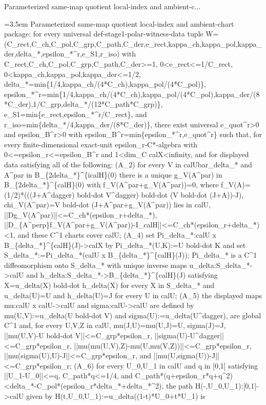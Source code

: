 \documentclass{article}
\newcommand{\step}[1]{\par\noindent\hangindent=3.5em\hangafter=1%
  \makebox[3.5em][l]{\textbf{#1.}}}
\begin{document}
\begin{proofbox}{Parameterized same-map quotient local-index and ambient-c...}
\step{1} Parameterized same-map quotient local-index and ambient-chart package: for every universal def-stage1-polar-witness-data tuple W=(C\_rect,C\_ch,C\_pol,C\_grp,C\_path,C\_der,e\_rect,kappa\_ch,kappa\_pol,kappa\_der,delta\_*,epsilon\_*\textasciicircum{}r,e\_S1,r\_iso) with C\_rect,C\_ch,C\_pol,C\_grp,C\_path,C\_der>=1, 0<e\_rect<=1/C\_rect, 0<kappa\_ch,kappa\_pol,kappa\_der<=1/2, delta\_*=min\{1/4,kappa\_ch/(4*C\_ch),kappa\_pol/(4*C\_pol)\}, epsilon\_*\textasciicircum{}r=min\{1/4,kappa\_ch/(4*C\_ch),kappa\_pol/(4*C\_pol),kappa\_der/(8*C\_der),1/C\_grp,delta\_*/(12*C\_path*C\_grp)\}, e\_S1=min\{e\_rect,epsilon\_*\textasciicircum{}r/C\_rect\}, and r\_iso=min\{delta\_*/4,kappa\_der/(8*C\_der)\}, there exist universal e\_quot\textasciicircum{}r>0 and epsilon\_B\textasciicircum{}r>0 with epsilon\_B\textasciicircum{}r=min\{epsilon\_*\textasciicircum{}r,e\_quot\textasciicircum{}r\} such that, for every finite-dimensional exact-unit epsilon\_r-C*-algebra with 0<=epsilon\_r<=epsilon\_B\textasciicircum{}r and 1<dim\_C calX<infinity, and for displayed data satisfying all of the following: (A\_2) for every V in calUbar\_delta\_* and A\textasciicircum{}par in B\_\{2delta\_*\}\textasciicircum{}\{icalH\}(0) there is a unique g\_V(A\textasciicircum{}par) in B\_\{2delta\_*\}\textasciicircum{}\{calH\}(0) with f\_V(A\textasciicircum{}par+g\_V(A\textasciicircum{}par))=0, where f\_V(A)=(1/2)*(((J+A\textasciicircum{}dagger) bold-dot V\textasciicircum{}dagger) bold-dot (V bold-dot (J+A))-J), chi\_V(A\textasciicircum{}par)=V bold-dot (J+A\textasciicircum{}par+g\_V(A\textasciicircum{}par)) lies in calU, ||Dg\_V(A\textasciicircum{}par)||<=C\_ch*(epsilon\_r+delta\_*), ||D\_\{A\textasciicircum{}perp\}f\_V(A\textasciicircum{}par+g\_V(A\textasciicircum{}par))-I\_calH||<=C\_ch*(epsilon\_r+delta\_*)<1, and these C\textasciicircum{}1 charts cover calU; (A\_4) set Pi\_delta\_*:calU x B\_\{delta\_*\}\textasciicircum{}\{calH\}(J)->calX by Pi\_delta\_*(U,K):=U bold-dot K and set S\_delta\_*:=Pi\_delta\_*(calU x B\_\{delta\_*\}\textasciicircum{}\{calH\}(J)); Pi\_delta\_* is a C\textasciicircum{}1 diffeomorphism onto S\_delta\_* with unique inverse maps u\_delta:S\_delta\_*->calU and h\_delta:S\_delta\_*->B\_\{delta\_*\}\textasciicircum{}\{calH\}(J) satisfying X=u\_delta(X) bold-dot h\_delta(X) for every X in S\_delta\_* and u\_delta(U)=U and h\_delta(U)=J for every U in calU; (A\_5) the displayed maps mu:calU x calU->calU and sigma:calU->calU are defined by mu(U,V):=u\_delta(U bold-dot V) and sigma(U):=u\_delta(U\textasciicircum{}dagger), are global C\textasciicircum{}1 and, for every U,V,Z in calU, mu(J,U)=mu(U,J)=U, sigma(J)=J, ||mu(U,V)-U bold-dot V||<=C\_grp*epsilon\_r, ||sigma(U)-U\textasciicircum{}dagger||<=C\_grp*epsilon\_r, ||mu(mu(U,V),Z)-mu(U,mu(V,Z))||<=C\_grp*epsilon\_r, ||mu(sigma(U),U)-J||<=C\_grp*epsilon\_r, and ||mu(U,sigma(U))-J||<=C\_grp*epsilon\_r; (A\_6) for every U\_0,U\_1 in calU and q in [0,1] satisfying ||U\_1-U\_0||<=q, C\_path*q<=1/4, and C\_path*(q+epsilon\_r*q+q\textasciicircum{}2)<delta\_*-C\_pol*(epsilon\_r*delta\_*+delta\_*\textasciicircum{}2), the path H(-,U\_0,U\_1):[0,1]->calU given by H(t,U\_0,U\_1):=u\_delta((1-t)*U\_0+t*U\_1) is 
\end{proofbox}
\end{document}
